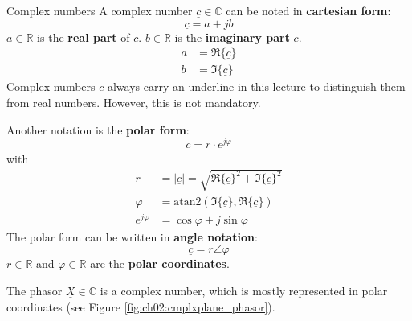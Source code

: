 \begin{refsection}
\begin{excursus}{Complex numbers}
	A complex number $\underline{c} \in \mathbb{C}$ can be noted in  \textbf{cartesian form}:
	\begin{equation}
		\underline{c} = a + j b
	\end{equation}
	$a \in \mathbb{R}$ is the  \textbf{real part} of $\underline{c}$. $b \in \mathbb{R}$ is the  \textbf{imaginary part} $\underline{c}$.
	\begin{subequations}
		\begin{align}
			a &= \Re\{\underline{c}\} \\
			b &= \Im\{\underline{c}\}
		\end{align}
	\end{subequations}
	Complex numbers $\underline{c}$ always carry an underline in this lecture to distinguish them from real numbers. However, this is not mandatory.

	Another notation is the  \textbf{polar form}:
	\begin{equation}
		\underline{c} = r \cdot e^{j \varphi}
	\end{equation}
	with
	\begin{subequations}
		\begin{align}
			r &= |\underline{c}| = \sqrt{\Re\{\underline{c}\}^2 + \Im\{\underline{c}\}^2} \\
			\varphi &= \mathrm{atan2} \left(\Im\{\underline{c}\}, \Re\{\underline{c}\}\right) \\
			e^{j \varphi} &= \cos \varphi + j \sin \varphi
		\end{align}
	\end{subequations}
	The polar form can be written in  \textbf{angle notation}:
	\begin{equation}
		\underline{c} = r \angle \varphi
	\end{equation}
	$r \in \mathbb{R}$ and $\varphi \in \mathbb{R}$ are the  \textbf{polar coordinates}.
\end{excursus}

The phasor $\underline{X} \in \mathbb{C}$ is a complex number, which is mostly represented in polar coordinates (see Figure \ref{fig:ch02:cmplxplane_phasor}).

\begin{figure}[H]
	\centering
\end{figure}
\end{refsection}
